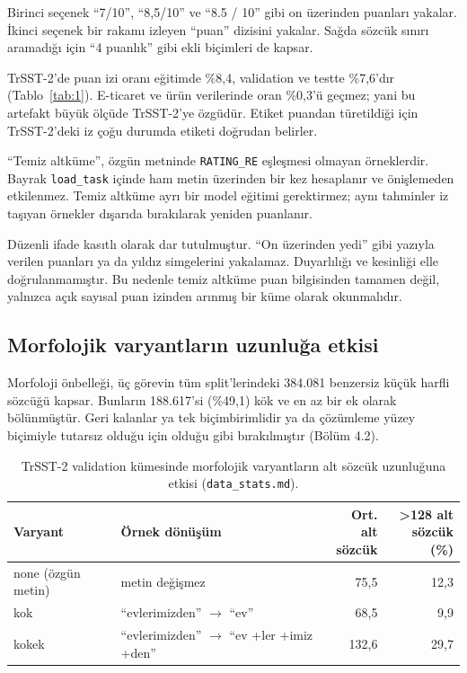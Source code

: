 \documentclass[11pt]{article}
\begin{document}
Birinci seçenek ``7/\allowbreak{}10'', ``8,5/\allowbreak{}10'' ve ``8.5 / 10'' gibi on üzerinden puanları yakalar. İkinci seçenek bir rakamı izleyen ``puan'' dizisini yakalar. Sağda sözcük sınırı aramadığı için ``4 puanlık'' gibi ekli biçimleri de kapsar.

TrSST-2'de puan izi oranı eğitimde \%8,4, validation ve testte \%7,6'dır (Tablo~\ref{tab:1}). E-ticaret ve ürün verilerinde oran \%0,3'ü geçmez; yani bu artefakt büyük ölçüde TrSST-2'ye özgüdür. Etiket puandan türetildiği için TrSST-2'deki iz çoğu durumda etiketi doğrudan belirler.

``Temiz altküme'', özgün metninde \texttt{RATING\_\allowbreak{}\allowbreak{}RE} eşleşmesi olmayan örneklerdir. Bayrak \texttt{load\_\allowbreak{}\allowbreak{}task} içinde ham metin üzerinden bir kez hesaplanır ve önişlemeden etkilenmez. Temiz altküme ayrı bir model eğitimi gerektirmez; aynı tahminler iz taşıyan örnekler dışarıda bırakılarak yeniden puanlanır.

Düzenli ifade kasıtlı olarak dar tutulmuştur. ``On üzerinden yedi'' gibi yazıyla verilen puanları ya da yıldız simgelerini yakalamaz. Duyarlılığı ve kesinliği elle doğrulanmamıştır. Bu nedenle temiz altküme puan bilgisinden tamamen değil, yalnızca açık sayısal puan izinden arınmış bir küme olarak okunmalıdır.

\subsection{Morfolojik varyantların uzunluğa etkisi}

Morfoloji önbelleği, üç görevin tüm split'lerindeki 384.081 benzersiz küçük harfli sözcüğü kapsar. Bunların 188.617'si (\%49,1) kök ve en az bir ek olarak bölünmüştür. Geri kalanlar ya tek biçimbirimlidir ya da çözümleme yüzey biçimiyle tutarsız olduğu için olduğu gibi bırakılmıştır (Bölüm 4.2).

\begin{table}[!htbp]
\centering
\small
\setlength{\tabcolsep}{4pt}
\begin{tabular}{llrr}
\toprule
Varyant & Örnek dönüşüm & \makecell[r]{Ort. alt \\ sözcük} & \makecell[r]{>128 alt \\ sözcük (\%)} \\
\midrule
none (özgün metin) & metin değişmez & \mbox{75,5} & \mbox{12,3} \\
kok & ``evlerimizden'' $\rightarrow$ ``ev'' & \mbox{68,5} & \mbox{9,9} \\
kokek & ``evlerimizden'' $\rightarrow$ ``ev +ler +imiz +den'' & \mbox{132,6} & \mbox{29,7} \\
\bottomrule
\end{tabular}
\caption{TrSST-2 validation kümesinde morfolojik varyantların alt sözcük uzunluğuna etkisi (\texttt{data\_\allowbreak{}\allowbreak{}stats.\allowbreak{}\allowbreak{}md}).}
\label{tab:3}
\end{table}
\end{document}
